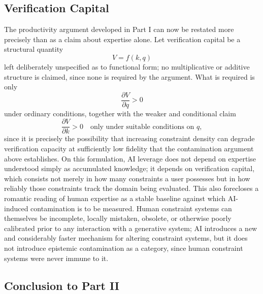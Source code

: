 \documentclass[11pt]{article}
\begin{document}
\subsection{Verification Capital}

The productivity argument developed in Part I can now be restated more precisely than as a claim about expertise alone. Let verification capital be a structural quantity
\[
V = f(k, q)
\]
left deliberately unspecified as to functional form; no multiplicative or additive structure is claimed, since none is required by the argument. What is required is only
\[
\frac{\partial V}{\partial q} > 0
\]
under ordinary conditions, together with the weaker and conditional claim
\[
\frac{\partial V}{\partial k} > 0 \quad \text{only under suitable conditions on } q,
\]
since it is precisely the possibility that increasing constraint density can degrade verification capacity at sufficiently low fidelity that the contamination argument above establishes. On this formulation, AI leverage does not depend on expertise understood simply as accumulated knowledge; it depends on verification capital, which consists not merely in how many constraints a user possesses but in how reliably those constraints track the domain being evaluated. This also forecloses a romantic reading of human expertise as a stable baseline against which AI-induced contamination is to be measured. Human constraint systems can themselves be incomplete, locally mistaken, obsolete, or otherwise poorly calibrated prior to any interaction with a generative system; AI introduces a new and considerably faster mechanism for altering constraint systems, but it does not introduce epistemic contamination as a category, since human constraint systems were never immune to it.

\subsection{Conclusion to Part II}
\end{document}
